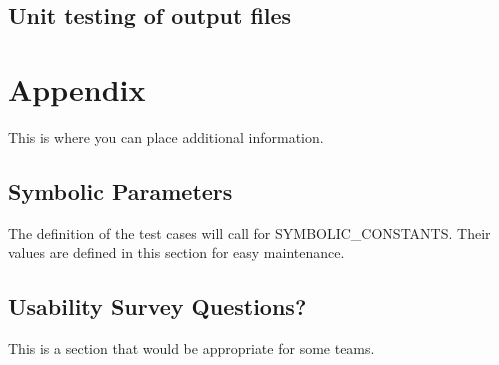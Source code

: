 \documentclass[11pt]{article}
\begin{document}
\subsection{Unit testing of output files}		





\newpage

\section{Appendix}

This is where you can place additional information.

\subsection{Symbolic Parameters}

The definition of the test cases will call for SYMBOLIC\_CONSTANTS.
Their values are defined in this section for easy maintenance.

\subsection{Usability Survey Questions?}

This is a section that would be appropriate for some teams.
\end{document}
